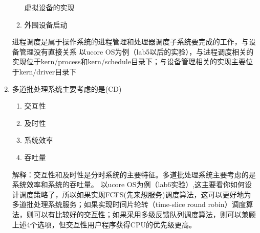\begin{enumerate}
\begin{enumerate}[A]
	虚拟设备的实现
	\item 
	外围设备启动
\end{enumerate}
进程调度是属于操作系统的进程管理和处理器调度子系统要完成的工作，与设备管理没有直接关系 以ucore OS为例（lab5以后的实验），与进程调度相关的实现位于kern/process和kern/schedule目录下；与设备管理相关的实现主要位于kern/driver目录下
\item 多道批处理系统主要考虑的是(CD)
\begin{enumerate}[A]
	\item 
	交互性
	\item 
	及时性
	\item 
	系统效率
	\item 
	吞吐量
\end{enumerate}
解释：交互性和及时性是分时系统的主要特征。多道批处理系统主要考虑的是系统效率和系统的吞吐量。 以ucore OS为例（lab6实验）,这主要看你如何设计调度策略了，所以如果实现FCFS(先来想服务)调度算法，这可以更好地为多道批处理系统服务；如果实现时间片轮转（time-slice round robin）调度算法，则可以有比较好的交互性；如果采用多级反馈队列调度算法，则可以兼顾上述4个选项，但交互性用户程序获得CPU的优先级更高。

\end{enumerate}